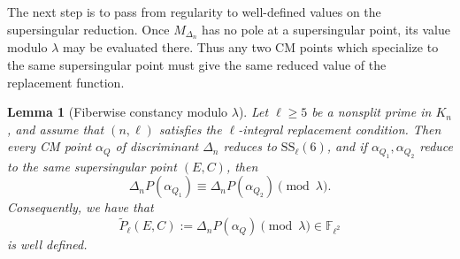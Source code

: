 \documentclass[12pt]{amsart}
\newtheorem{lemma}[theorem]{Lemma}
\theoremstyle{definition}
\theoremstyle{remark}
\begin{document}
The next step is to pass from regularity to well-defined values on the
supersingular reduction.  Once $M_{\Delta_n}$ has no pole at a
supersingular point, its value modulo $\lambda$ may be evaluated there.
Thus any two CM points which specialize to the same supersingular point
must give the same reduced value of the replacement function.


\begin{lemma}[Fiberwise constancy modulo $\lambda$]
\label{lem:fiberwise-const}
Let $\ell\geq 5$ be a nonsplit prime in $K_n$, and assume that
$(n,\ell)$ satisfies the $\ell$-integral replacement condition.  Then
every CM point $\alpha_Q$ of discriminant $\Delta_n$ reduces to
$\mathrm{SS}_\ell(6)$, and if $\alpha_{Q_1},\alpha_{Q_2}$ reduce to the
same supersingular point $(E,C)$, then
\[
        \Delta_n P(\alpha_{Q_1})
        \equiv
        \Delta_n P(\alpha_{Q_2})
        \pmod{\lambda}.
\]
Consequently, we have that
\[
        \widetilde{P}_\ell(E,C)
        :=
        \Delta_n P(\alpha_Q) \pmod{\lambda}
        \in \mathbb{F}_{\ell^2}
\]
is well defined.
\end{lemma}
\end{document}
